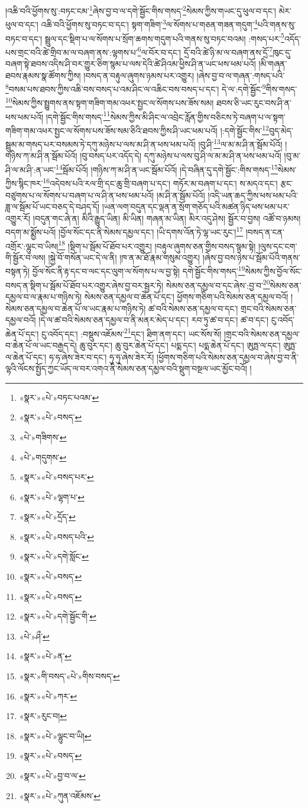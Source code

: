།འཆི་བའི་ཕྱོགས་སུ་:བཏང་ངམ་\footnote{«སྣར་»«པེ་»བཏང་པའམ་}ཞེས་བྱ་བ་ལ་དགེ་སྦྱོང་གིས་གསད་\footnote{«སྣར་»«པེ་»བསད་}སེམས་ཀྱིས་གཡང་དུ་ཕུལ་བ་དང་། མེར་ཕུལ་བ་དང་། འཆི་བའི་ཕྱོགས་སུ་བཏང་བ་དང་། སྟག་གཟིག་\footnote{«པེ་»གཟིགས་}ལ་སོགས་པ་གཅན་གཟན་གདུག་\footnote{«པེ་»གདུགས་}པའི་གནས་སུ་བཏང་བ་དང་། སྦྲུལ་དང་སྡིག་པ་ལ་སོགས་པ་སྲོག་ཆགས་གདུག་པའི་གནས་སུ་བཏང་བའམ། :གསད་པར་\footnote{«སྣར་»«པེ་»བསད་པར་}འདོད་པས་གྲང་བའི་ཚེ་གྲིབ་མ་ལ་བཞག་ནས་:ལྷགས་པ་\footnote{«སྣར་»«པེ་»ལྷག་པ་}ལ་བོར་བ་དང་། དྲོ་བའི་ཚེ་ཉི་མ་ལ་བཞག་ནས་དྲོ་\footnote{«སྣར་»«པེ་»དྲོད་}ཁུང་དུ་བཞག་སྟེ་ཐབས་འདིས་ཤི་བར་གྱུར་ཅིག་སྙམ་པ་ལས་དེའི་ཚེ་ཤིའམ་ཕྱིས་ཤི་ན་ཡང་ཕས་ཕམ་པའོ། །མི་གཞན་ཐབས་རྣམས་སྣ་ཚོགས་ཀྱིས། །བསད་ན་བརྟུལ་ཞུགས་ཉམས་པར་འགྱུར། །ཞེས་བྱ་བ་ལ་གཞན་:གསད་པའི་\footnote{«སྣར་»«པེ་»བསད་པའི་}བསམ་པས་ཐབས་ཀྱིས་འཆི་བས་བསད་པ་འམ་ཤིང་ལ་འཆིང་བས་བསད་པ་དང་། དེ་ལ་:དགེ་སྦྱོང་\footnote{«སྣར་»«པེ་»དགེ་སློང་}གིས་གསད་\footnote{«སྣར་»«པེ་»བསད་}སེམས་ཀྱིས་སྤྱུགས་ནས་སྟག་གཟིག་གམ་འཕར་སྤྱང་ལ་སོགས་པས་ཟོས་སམ། ཐབས་ཅི་ཡང་རུང་བས་ཤི་ན་ཕས་ཕམ་པའོ། །དགེ་སྦྱོང་གིས་གསད་\footnote{«སྣར་»«པེ་»བསད་}སེམས་ཀྱིས་མི་ཤིང་ལ་འབྲེང་རློན་གྱིས་བཅིངས་ཏེ་བཞག་པ་ལ་སྟག་གཟིག་གམ་འཕར་སྤྱང་ལ་སོགས་པས་ཟོས་སམ་ཅིའི་ཐབས་ཀྱིས་ཤི་ཡང་ཕམ་པའོ། །:དགེ་སྦྱོང་གིས་\footnote{«སྣར་»«པེ་»དགེ་སྦྱོང་གི་}བུད་མེད་སྦྲུམ་མ་གསད་པར་བསམས་ཏེ་དཀུ་མཉེས་པ་ལས་མ་ཤི་ན་ཕས་ཕམ་པའོ། །བུ་ཤི་\footnote{«པེ་»ཤྀ་}ལ་མ་མ་ཤི་ན་སྦོམ་པོའོ། །གཉིས་ཀ་མ་ཤི་ན་སྦོམ་པོའོ། །བུ་བསད་པར་འདོད་དེ། དཀུ་མཉེས་པ་ལས་བུ་ཤི་ལ་མ་མ་ཤི་ན་ཕས་ཕམ་པའོ། །བུ་མ་ཤི་ལ་མ་ཤི་:ན་ཡང་\footnote{«སྣར་»«པེ་»ན་}སྦོམ་པོའོ། །གཉིས་ཀ་མ་ཤི་ན་ཡང་སྦོམ་པོའོ། །དེ་བཞིན་དུ་དགེ་སྦྱོང་:གིས་གསད་\footnote{«སྣར་»གི་བསད་«པེ་»གིས་བསད་}སེམས་ཀྱིས་སྙིང་ཁར་\footnote{«སྣར་»«པེ་»ཀར་}འདེབས་པའི་རལ་གྲི་དང་ཆུ་གྲི་བཞག་པ་དང་། གཏོར་མ་བཞག་པ་དང་། ས་མདའ་དང་། རྩང་བཙུགས་པ་ལ་སོགས་པ་བཞག་པ་ལ་ཤི་ན་ཕས་ཕམ་པའོ། །མ་ཤི་ན་སྦོམ་པོའོ། །འདི་ཡན་ཆད་ཀྱིས་ཕས་ཕམ་པའི་ཟླ་ལ་སྦོམ་པོ་ཡང་བཅད་དེ་བཤད་དོ། །ཡན་ལག་བདུན་དང་ལྡན་ན་སྲོག་གཅོད་པའི་མཚན་ཉིད་ཕས་ཕམ་པར་འགྱུར་རོ། །བདུན་གང་ཞེ་ན། མིའི་རྒྱུད་ཡིན། མི་ཡིན། གཞན་མ་ཡིན། མིར་འདུ་ཤེས། སྦྱོར་བ་བྱས། འཚོ་བ་ཉམས། བདག་མ་སྨྱོས་པའོ། །བྱོལ་སོང་དང་ནི་སེམས་དམྱལ་དང་། །ཡི་དགས་འོན་ཏེ་ལྷ་ཡང་རུང་།\footnote{«སྣར་»རུང་བ།} །བསད་ན་ངན་འགྲོར་:ལྷུང་བ་ཡིས།\footnote{«སྣར་»«པེ་»ལྷུང་བ་ཡི།} །སྡིག་པ་སྦོམ་པོ་ཐོབ་པར་འགྱུར། །བརྟུལ་ཞུགས་ཅན་གྱིས་བསད་སྙམ་སྟེ། །ལུས་དང་ངག་གི་སྦྱོར་བ་ལས། །སྐྱེ་བོ་གསོན་ཡང་དེ་ལ་ནི། །ཁ་ན་མ་ཐོ་རྣམ་གསུམ་འགྱུར། །ཞེས་བྱ་བས་ཉེས་པ་སྦོམ་པོའི་གནས་བསྟན་ཏེ། བྱོལ་སོང་ནི་རྟ་དང་བ་ལང་དང་ལུག་ལ་སོགས་པ་ལ་བྱ་སྟེ། དགེ་སྦྱོང་གིས་གསད་\footnote{«སྣར་»«པེ་»བསད་}སེམས་ཀྱིས་བྱོལ་སོང་བསད་ན་སྡིག་པ་སྦོམ་པོ་ཐོབ་པར་འགྱུར་ཞེས་བྱ་བར་སྦྱར་ཏེ། སེམས་ཅན་དམྱལ་བ་དང་ཞེས་:བྱ་བ་\footnote{«སྣར་»«པེ་»བྱ་བ་ལ་}སེམས་ཅན་དམྱལ་བ་ལ་རྣམ་པ་གཉིས་ཏེ། སེམས་ཅན་དམྱལ་བ་ཆེན་པོ་དང་། ཕྱོགས་གཅིག་པའི་སེམས་ཅན་དམྱལ་བའོ། །སེམས་ཅན་དམྱལ་བ་ཆེན་པོ་ལ་ཡང་རྣམ་པ་གཉིས་ཏེ། ཚ་བའི་སེམས་ཅན་དམྱལ་བ་དང་། གྲང་བའི་སེམས་ཅན་དམྱལ་བའོ། །དེ་ལ་ཚ་བའི་སེམས་ཅན་དམྱལ་བ་ནི་མནར་མེད་པ་དང་། རབ་ཏུ་ཚ་བ་དང་། ཚ་བ་དང་། ངུ་འབོད་ཆེན་པོ་དང་། ངུ་འབོད་དང་། :བསྡུས་འཇོམས་\footnote{«སྣར་»«པེ་»ཀུན་འཇོམས་}དང་། ཐིག་ནག་དང་། ཡང་སོས་སོ། །གྲང་བའི་སེམས་ཅན་དམྱལ་བ་ཆེན་པོ་ལ་ཡང་བརྒྱད་དེ། ཆུ་བུར་དང་། ཆུ་བུར་ཆེན་པོ་དང་། པདྨ་དང་། པདྨ་ཆེན་པོ་དང་། ཨུཏྤ་ལ་དང་། ཨུཏྤ་ལ་ཆེན་པོ་དང་། ཧ་ཧ་ཞེས་ཟེར་བ་དང་། ཧུ་ཧུ་ཞེས་ཟེར་རོ། །ཕྱོགས་གཅིག་པའི་སེམས་ཅན་དམྱལ་བ་ཞེས་བྱ་བ་ནི་ལྷའི་ལོངས་སྤྱོད་ཀྱང་ཡོད་ལ་བར་འགའ་ནི་སེམས་ཅན་དམྱལ་བའི་སྡུག་བསྔལ་ཡང་མྱོང་བའོ། །
